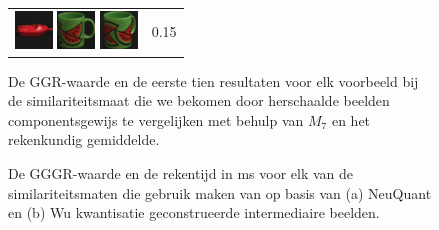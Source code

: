 {\begin{figure}[p]
\begin{tabular}{m{11cm} | m{3cm} |}
\includegraphics[width=1cm]{coil/beeld-19.eps}
\includegraphics[width=1cm]{coil/beeld-30.eps}
\includegraphics[width=1cm]{coil/beeld-33.eps}
& {\scriptsize 0.15}
\\
\end{tabular}
\vspace{5pt}
\caption{\label{fig:results_beste_scaling}De GGR-waarde en de eerste tien resultaten voor elk 
voorbeeld bij de similariteitsmaat die we bekomen door herschaalde beelden componentsgewijs 
te vergelijken met behulp van $M_7$ en het rekenkundig gemiddelde.}
\end{figure}

\begin{figure}[p]
\vspace{5pt}
\centering
{}
\caption{\label{fig:dom_colors_gggrs_en_cputimes}De GGGR-waarde en de rekentijd in ms 
voor elk van de similariteitsmaten die gebruik maken 
van op basis van (a) NeuQuant en (b) Wu kwantisatie geconstrueerde intermediaire beelden.}
\end{figure}

}
